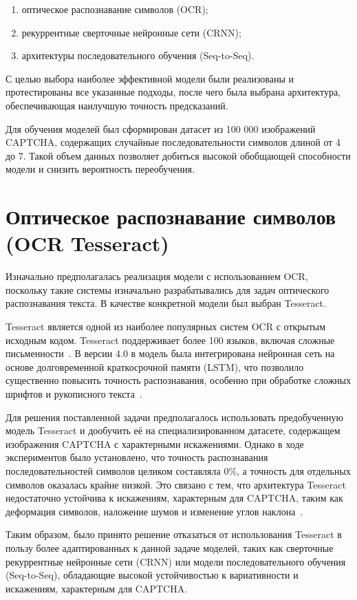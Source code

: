 \documentclass{altsu-report}
\begin{document}
\begin{enumerate}
    \item оптическое распознавание символов (OCR);
    \item рекуррентные сверточные нейронные сети (CRNN);
    \item архитектуры последовательного обучения (Seq-to-Seq).
\end{enumerate}

С целью выбора наиболее эффективной модели были реализованы и протестированы все указанные подходы, после чего была выбрана архитектура, обеспечивающая наилучшую точность предсказаний.

Для обучения моделей был сформирован датасет из 100 000 изображений CAPTCHA, содержащих случайные последовательности символов длиной от 4 до 7. Такой объем данных позволяет добиться высокой обобщающей способности модели и снизить вероятность переобучения.

\section{Оптическое распознавание символов (OCR Tesseract)}

Изначально предполагалась реализация модели с использованием OCR, поскольку такие системы изначально разрабатывались для задач оптического распознавания текста. В качестве конкретной модели был выбран Tesseract.

Tesseract является одной из наиболее популярных систем OCR с открытым исходным кодом. Tesseract поддерживает более 100 языков, включая сложные письменности~\cite{Klippa}. В версии 4.0 в модель была интегрирована нейронная сеть на основе долговременной краткосрочной памяти (LSTM), что позволило существенно повысить точность распознавания, особенно при обработке сложных шрифтов и рукописного текста~\cite{GitTesseract}.

Для решения поставленной задачи предполагалось использовать предобученную модель Tesseract и дообучить её на специализированном датасете, содержащем изображения CAPTCHA с характерными искажениями. Однако в ходе экспериментов было установлено, что точность распознавания последовательностей символов целиком составляла 0\%, а точность для отдельных символов оказалась крайне низкой. Это связано с тем, что архитектура Tesseract недостаточно устойчива к искажениям, характерным для CAPTCHA, таким как деформация символов, наложение шумов и изменение углов наклона~\cite{TrainTesseract}.

Таким образом, было принято решение отказаться от использования Tesseract в пользу более адаптированных к данной задаче моделей, таких как сверточные рекуррентные нейронные сети (CRNN) или модели последовательного обучения (Seq-to-Seq), обладающие высокой устойчивостью к вариативности и искажениям, характерным для CAPTCHA.
\end{document}
